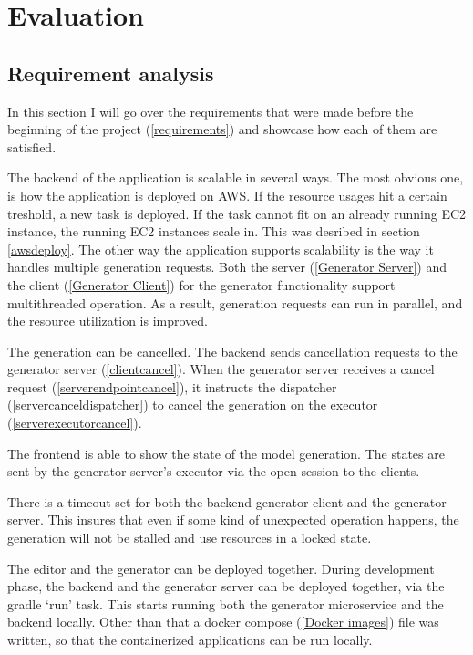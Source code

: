 \chapter{Evaluation}\label{Evaluation}

	\section{Requirement analysis}
	In this section I will go over the requirements that were made before the beginning of the project (\ref{requirements}) 
	and showcase how each of them are satisfied.

	The backend of the application is scalable in several ways. The most obvious one, is how the application is deployed on AWS. 
	If the resource usages hit a certain treshold, a new task is deployed. If the task cannot fit on an already running EC2 instance,
	the running EC2 instances scale in. This was desribed in section \ref{awsdeploy}. The other way the application supports 
	scalability is the way it handles multiple generation requests. Both the server (\ref{Generator Server}) and the client
	(\ref{Generator Client}) for the generator 
	functionality support multithreaded operation. As a result, generation requests can run in parallel, and the resource utilization
	is improved.

	The generation can be cancelled. The backend sends cancellation requests to the generator server (\ref{clientcancel}).
	When the generator server receives a cancel request (\ref{serverendpointcancel}), it instructs the dispatcher 
	(\ref{servercanceldispatcher}) to cancel the generation on the executor (\ref{serverexecutorcancel}).

	The frontend is able to show the state of the model generation. The states are sent by the generator server's executor via
	the open session to the clients.

	There is a timeout set for both the backend generator client and the generator server. This insures that even if some kind of 
	unexpected operation happens, the generation will not be stalled and use resources in a locked state.

	The editor and the generator can be deployed together. During development phase, the backend and the generator server can be 
	deployed together, via the gradle `run' task. This starts running both the generator microservice and the backend locally.
	Other than that a docker compose (\ref{Docker images}) file was written, so that the containerized applications can be run locally.

